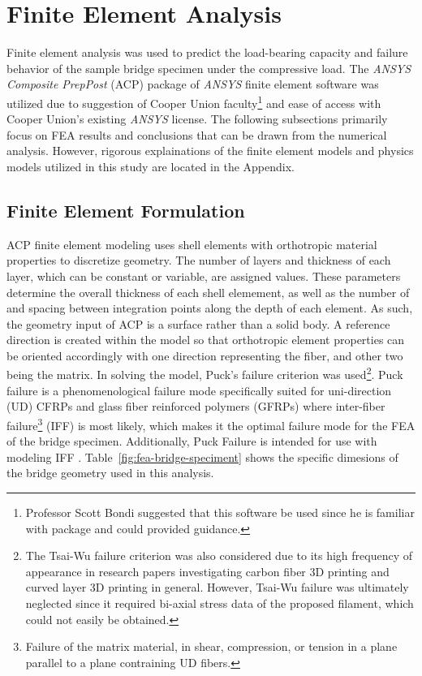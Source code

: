 \section{Finite Element Analysis}

\indent

Finite element analysis was used to predict the load-bearing capacity and failure behavior of the sample bridge specimen under the compressive load. The \textit{ANSYS Composite PrepPost} (ACP) package of \textit{ANSYS} finite element software was utilized due to suggestion of Cooper Union faculty\footnote{Professor Scott Bondi suggested that this software be used since he is familiar with package and could provided guidance.} and ease of access with Cooper Union's existing \textit{ANSYS} license. The following subsections primarily focus on FEA results and conclusions that can be drawn from the numerical analysis. However, rigorous explainations of the finite element models and physics models utilized in this study are located in the Appendix.\\

\subsection{Finite Element Formulation}

\indent

ACP finite element modeling uses shell elements with orthotropic material properties to discretize geometry. The number of layers and thickness of each layer, which can be constant or variable, are assigned values. These parameters determine the overall thickness of each shell elemement, as well as the number of and spacing between integration points along the depth of each element. As such, the geometry input of ACP is a surface rather than a solid body. A reference direction is created within the model so that orthotropic element properties can be oriented accordingly with one direction representing the fiber, and other two being the matrix. In solving the model, Puck's failure criterion was used\footnote{The Tsai-Wu failure criterion was also considered due to its high frequency of appearance in research papers investigating carbon fiber 3D printing and curved layer 3D printing in general. However, Tsai-Wu failure was ultimately neglected since it required bi-axial stress data of the proposed filament, which could not easily be obtained.}. Puck failure is a phenomenological failure mode specifically suited for uni-direction (UD) CFRPs and glass fiber reinforced polymers (GFRPs) where inter-fiber failure\footnote{Failure of the matrix material, in shear, compression, or tension in a plane parallel to a plane contraining UD fibers.} (IFF) is most likely, which makes it the optimal failure mode for the FEA of the bridge specimen. Additionally, Puck Failure is intended for use with modeling IFF \cite{Puck-Stuttgard} \cite{Puck-NASA}. Table~\ref{fig:fea-bridge-speciment} shows the specific dimesions of the bridge geometry used in this analysis.\\

